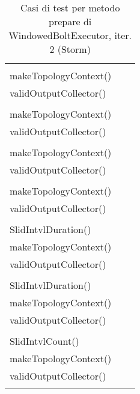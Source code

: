 \documentclass[10pt, a4paper]{article}
\newcommand{\Intmaketable}[4]{
	\begin{longtable}{#3}
	#4
	\caption{#2}
	\label{#1}
	\end{longtable}
}
\newcommand{\Inttestctable}[3]{
	\Intmaketable{#1}{#2}{|l|l|l|}{
	\hline
	\thead{Input} & \thead{Esito atteso} & \thead{Motivazione}\\
	\hline
	\hline
	#3
	\hline}
}
\newcommand{\Inttestccaption}[4]{Casi di test per metodo #1 di #2, iter. #3 (#4)}
\newcommand{\gettablelabel}[5]{table:#1:#2:#3:iter#4:proj#5}
\newcommand{\testctable}[5]{
	\Inttestctable{\gettablelabel{testc}{#1}{#2}{#3}{#4}}
		{\Inttestccaption{#1}{#2}{#3}{#4}}
		{#5}
}
\newcommand{\tcell}{\makecell[tl]}
\newcommand{\newtrow}{\\ \hline}
\def\storm{Storm}
\begin{document}
	\testctable{prepare}{WindowedBoltExecutor}{2}{\storm}{
			\tcell{validWinLenCount()\\makeTopologyContext()\\validOutputCollector()} &
			\tcell{Terminazione con successo} &
			\tcell{La configurazione è valida}
		\newtrow
			\tcell{invalidWinLenCount()\\makeTopologyContext()\\validOutputCollector()} &
			\tcell{IllegalArgumentException viene lanciata} &
			\tcell{La configurazione è invalida}
		\newtrow
			\tcell{validWinLenDuration()\\makeTopologyContext()\\validOutputCollector()} &
			\tcell{Terminazione con successo} &
			\tcell{La configurazione è valida}
		\newtrow
			\tcell{invalidWinLenDuration()\\makeTopologyContext()\\validOutputCollector()} &
			\tcell{IllegalArgumentException viene lanciata} &
			\tcell{La configurazione è invalida}
		\newtrow
			\tcell{validBothWinLenAnd\\SlidIntvlDuration()\\makeTopologyContext()\\validOutputCollector()} &
			\tcell{Terminazione con successo} &
			\tcell{La configurazione è valida}
		\newtrow
			\tcell{invalidBothWinLenAnd\\SlidIntvlDuration()\\makeTopologyContext()\\validOutputCollector()} &
			\tcell{IllegalArgumentException viene lanciata} &
			\tcell{La configurazione è invalida}
		\newtrow
			\tcell{invalidBothWinLenAnd\\SlidIntvlCount()\\makeTopologyContext()\\validOutputCollector()} &
			\tcell{IllegalArgumentException viene lanciata} &
			\tcell{La configurazione è invalida}
		\newtrow
	}
	
	\newpage
	
\end{document}
